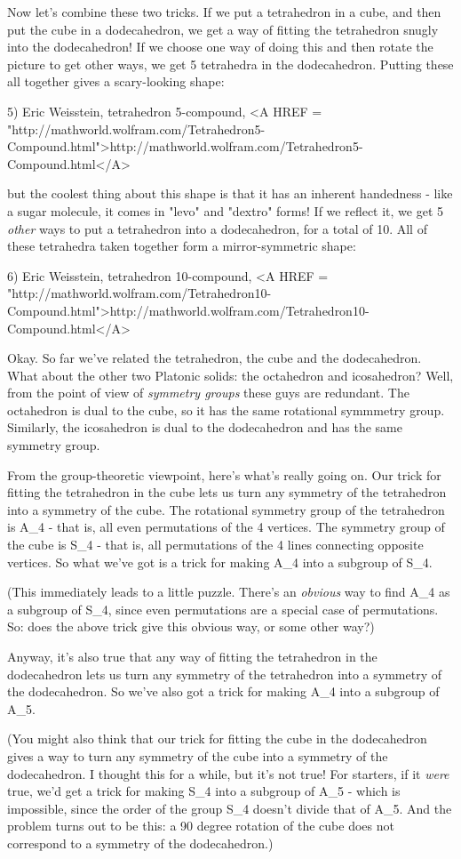 Now let's combine these two tricks.  If we put a tetrahedron in a cube,
and then put the cube in a dodecahedron, we get a way of fitting the
tetrahedron snugly into the dodecahedron!  If we choose one way of doing
this and then rotate the picture to get other ways, we get 5 tetrahedra
in the dodecahedron.  Putting these all together gives a scary-looking
shape:

5) Eric Weisstein, tetrahedron 5-compound, 
<A HREF = "http://mathworld.wolfram.com/Tetrahedron5-Compound.html">http://mathworld.wolfram.com/Tetrahedron5-Compound.html</A>

but the coolest thing about this shape is that it has an inherent
handedness - like a sugar molecule, it comes in "levo" and
"dextro" forms!  If we reflect it, we get 5 \emph{other} ways to
put a tetrahedron into a dodecahedron, for a total of 10.  All of these
tetrahedra taken together form a mirror-symmetric shape:

6) Eric Weisstein, tetrahedron 10-compound, 
<A HREF = "http://mathworld.wolfram.com/Tetrahedron10-Compound.html">http://mathworld.wolfram.com/Tetrahedron10-Compound.html</A>

Okay.  So far we've related the tetrahedron, the cube and the dodecahedron.  
What about the other two Platonic solids: the octahedron and icosahedron?  
Well, from the point of view of \emph{symmetry groups} these guys are
redundant.  The octahedron is dual to the cube, so it has the same
rotational symmmetry group. Similarly, the icosahedron is dual to the
dodecahedron and has the same symmetry group.

From the group-theoretic viewpoint, here's what's really going on.  Our
trick for fitting the tetrahedron in the cube lets us turn any symmetry
of the tetrahedron into a symmetry of the cube.  The rotational symmetry
group of the tetrahedron is A_{4} - that is, all even
permutations of the 4 vertices.  The symmetry group of the cube is
S_{4} - that is, all permutations of the 4 lines connecting
opposite vertices.  So what we've got is a trick for making
A_{4} into a subgroup of S_{4}. 

(This immediately leads to a little puzzle.  There's an \emph{obvious} way
to find A_{4} as a subgroup of S_{4}, since even 
permutations are a special
case of permutations.   So: does the above trick give this obvious way,
or some other way?)

Anyway, it's also true that any way of fitting the tetrahedron
in the dodecahedron lets us turn any symmetry
of the tetrahedron into a symmetry of the dodecahedron.  
So we've also got a trick for making A_{4} into a subgroup of 
A_{5}.

(You might also think that our trick for fitting the cube in
the dodecahedron gives a way to turn any symmetry of the
cube into a symmetry of the dodecahedron.   I thought this for a while,
but it's not true!  For starters, if it \emph{were} true, we'd get
a trick for making S_{4} into a subgroup of A_{5} -
which is impossible, since the order of the group S_{4} 
doesn't divide that of A_{5}.  And the problem turns out
to be this: a 90 degree rotation of the cube does not correspond
to a symmetry of the dodecahedron.)



